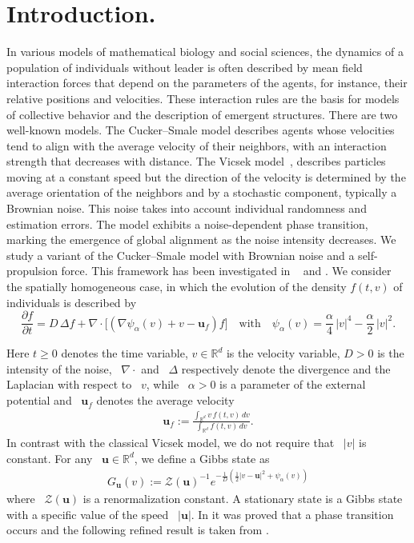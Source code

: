 \documentclass[reqno]{amsart} %
\begin{document}
  \section{Introduction.} In various models of mathematical biology and social sciences, the dynamics of a population of individuals without leader is often described by mean field interaction forces that depend on the parameters of the agents, for instance, their relative positions and velocities. These interaction rules are the basis for models of collective behavior and the description of emergent structures. There are two  well-known models. The Cucker–Smale model \cite{CuckerSmale2007}  describes agents whose velocities tend to align with the average velocity of their  neighbors, with an interaction strength that decreases with distance. The Vicsek model~\cite{Vicsek1995}, describes particles moving at a constant speed but the direction of the velocity is determined by the average orientation of the neighbors and by a stochastic component, typically a Brownian noise. This noise takes into account individual randomness and estimation errors. The model exhibits a noise-dependent phase transition, marking the emergence of global alignment as the noise intensity decreases. We study a variant of the Cucker–Smale model with Brownian noise and a self-propulsion force. This framework has been investigated in ~\cite{BarbaroCanizoDegondphasetransi,Li2021,Pareschinumerique}  and \cite{Tugaut2014}. We consider the spatially homogeneous case, in which the evolution of the density $f(t,v)$ of individuals is described by 
\begin{equation}
\label{PDE}
\frac{\partial f}{\partial t} = D \, \Delta f + \nabla \cdot \big[ \left(\nabla \psi_{\alpha}(v)+v - \mathbf{u}_{f}   \right) f\big]\quad \text{with} \quad \psi_{\alpha}(v) = \frac{\alpha}{4} \,|v|^4 - \frac{\alpha}{2}\,|v|^2.
\end{equation}


\noindent Here $t \geq 0$ denotes the time variable, $v \in \mathbb{R}^d $ is the velocity variable, $D>0$ is the intensity of the noise,~ $\nabla \cdot$ and ~$\Delta$ respectively denote the divergence and the Laplacian with respect to ~$v$, while ~$\alpha>0$ is a parameter  of the external potential
and ~$\mathbf{u}_{f} $ denotes the average velocity
\begin{align*}
    \mathbf{u}_{f}:= \frac{\int_{\mathbb{R}^d} v \, f(t,v)\,dv}{\int_{\mathbb{R}^d}f(t,v)\,dv}.
\end{align*}
In contrast with the classical Vicsek model, we do not require that ~$|v|$ is constant.
For any ~$\mathbf{u}\in \mathbb{R}^d$, we define a Gibbs state as 
\begin{align}
\label{Gibbsstate}
    G_\mathbf{u}(v):=\mathcal{Z}(\mathbf{u})^{-1} {e^{-\frac{1}{D}\left(\frac{1}{2}|v-\mathbf{u}|^2+ \psi_{\alpha}(v)\right)}}
\end{align}
where ~$\mathcal{Z}(\mathbf{u})$ is a renormalization constant. A stationary state is a Gibbs state with a specific value of the speed ~$|\mathbf{u}|$. In \cite{BarbaroCanizoDegondphasetransi} it was proved  that a phase transition occurs and the following refined result is taken from \cite{Li2021}.
\end{document}
